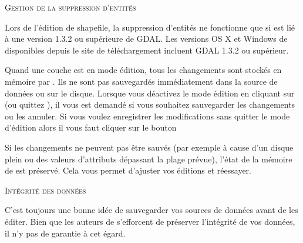 \begin{Tip}[ht]\caption{\textsc{Gestion de la suppression d'entités}}
Lors de l'édition de shapefile, la suppression d'entités ne fonctionne que si \qg est lié à une version 1.3.2 ou supérieure de GDAL. Les versions OS X et Windows de \qg disponibles depuis le site de téléchargement incluent GDAL 1.3.2 ou supérieur.
\end{Tip}


Quand une couche est en mode édition, tous les changements sont stockés en mémoire par \qg. Ils ne sont pas sauvegardés immédiatement dans la source de données ou sur le disque. Lorsque vous déactivez le mode édition en cliquant sur (ou quittez \qg), il vous est demandé si vous souhaitez sauvegarder les changements ou les annuler. Si vous voulez enregistrer les modifications sans quitter le mode d'édition alors il vous faut cliquer sur le bouton 

Si les changements ne peuvent pas être sauvés (par exemple à cause d'un disque plein ou des valeurs d'attributs dépassant la plage prévue), l'état de la mémoire de \qg est préservé. Cela vous permet d'ajuster vos éditions et réessayer.

\begin{Tip}[ht]\caption{\textsc{Intégrité des données}}
C'est toujours une bonne idée de sauvegarder vos sources de données avant de les éditer. Bien que les auteurs de \qg s'efforcent de préserver l'intégrité de vos données, il n'y pas de garantie à cet égard.
\end{Tip}

